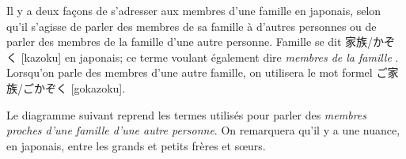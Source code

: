 \documentclass[a4paper,11pt,final]{article}
\newcommand{\sectit}[1]{\bigskip\hspace{-5mm}{\color{sectionblue}$\blacksquare$~~\Large\bfseries #1}}
\newcommand{\romaji}[1]{{\footnotesize[#1]}}
\begin{document}

\vspace{15mm}


Il y a deux façons de s'adresser aux membres d'une famille en japonais, selon
qu'il s'agisse de parler des membres de sa famille à d'autres personnes ou
de parler des membres de la famille d'une autre personne. Famille se dit
家族/かぞく \romaji{kazoku} en japonais; ce terme voulant également dire
\textit{\og membres de la famille \fg}. Lorsqu'on parle des membres d'une autre
famille, on utilisera le mot formel ご家族/ごかぞく \romaji{gokazoku}.


\sectit{Membres proches}

Le diagramme suivant reprend les termes utilisés pour parler des \emph{membres
proches d'une famille d'une autre personne}. On remarquera qu'il y a une
nuance, en japonais, entre les grands et petits frères et s\oe urs.
\end{document}
